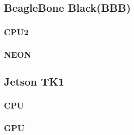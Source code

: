 \subsection{BeagleBone Black(BBB)}
\subsubsection{CPU2}
\subsubsection{NEON}


\subsection{Jetson TK1}
\subsubsection{CPU}
\subsubsection{GPU}